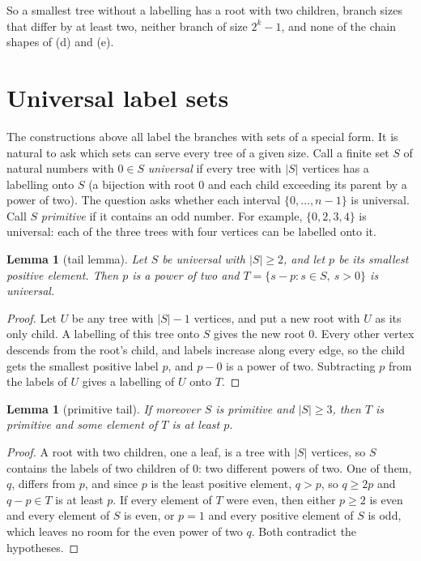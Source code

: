 \documentclass[11pt]{article}
\newtheorem{lemma}[theorem]{Lemma}
\theoremstyle{remark}
\begin{document}
So a smallest tree without a labelling has a root with two children, branch sizes that differ by
at least two, neither branch of size $2^k-1$, and none of the chain shapes of (d) and (e).

\section{Universal label sets}

The constructions above all label the branches with sets of a special form. It is natural to ask
which sets can serve every tree of a given size. Call a finite set $S$ of natural numbers with
$0\in S$ \emph{universal} if every tree with $|S|$ vertices has a labelling onto $S$ (a bijection
with root $0$ and each child exceeding its parent by a power of two). The question asks whether
each interval $\{0,\dots,n-1\}$ is universal. Call $S$ \emph{primitive} if it contains an odd
number. For example, $\{0,2,3,4\}$ is universal: each of the three trees with four vertices
can be labelled onto it.

\begin{lemma}[tail lemma]\label{lem:tail}
Let $S$ be universal with $|S|\ge2$, and let $p$ be its smallest positive element. Then $p$ is a
power of two and $T=\{s-p:s\in S,\ s>0\}$ is universal.
\end{lemma}

\begin{proof}
Let $U$ be any tree with $|S|-1$ vertices, and put a new root with $U$ as its only child. A
labelling of this tree onto $S$ gives the new root $0$. Every other vertex descends from the
root's child, and labels increase along every edge, so the child gets the smallest positive
label $p$, and $p-0$ is a power of two. Subtracting $p$ from the labels of $U$ gives a labelling
of $U$ onto $T$.
\end{proof}

\begin{lemma}[primitive tail]\label{lem:prim}
If moreover $S$ is primitive and $|S|\ge3$, then $T$ is primitive and some element of $T$ is at
least $p$.
\end{lemma}

\begin{proof}
A root with two children, one a leaf, is a tree with $|S|$ vertices, so $S$ contains the labels
of two children of $0$: two different powers of two. One of them, $q$, differs from $p$, and
since $p$ is the least positive element, $q>p$, so $q\ge2p$ and $q-p\in T$ is at least $p$.
If every element of $T$ were even, then either $p\ge2$ is even and every element of $S$ is even,
or $p=1$ and every positive element of $S$ is odd, which leaves no room for the even power of two
$q$. Both contradict the hypotheses.
\end{proof}
\end{document}
